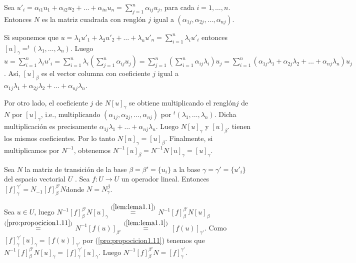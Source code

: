     		\begin{demo}
    			\normalfont
    			Sea $ u'_{i} = \alpha_{i1}u_{1}+\alpha_{i2}u_{2}+\ldots+\alpha_{in}u_{n} = \sum_{j=1}^{n}\alpha_{ij}u_{j}$, para cada $ i = 1,\ldots,n $. Entonces $ N $ es la matriz cuadrada con renglón $ j $ igual a $ (\alpha_{1j},\alpha_{2j},\ldots,\alpha_{nj}) $.
    	
    	Si suponemos que $ u = \lambda_{1}u'_{1}+\lambda_{2}u'_{2}+\ldots+\lambda_{n}u'_{n} = \sum_{i=1}^{n}\lambda_{i}u'_{i}$ entonces $ [u]_{\gamma} = ^{t}(\lambda_{1}, \ldots, \lambda_{n})$. Luego $ u = \sum_{i=1}^{n}\lambda_{i}u'_{i} = \sum_{i=1}^{n}\lambda_{i}(\sum_{j=1}^{n}\alpha_{ij}u_{j}) =  \sum_{j=1}^{n}(\sum_{i=1}^{n}\alpha_{ij}\lambda_{i})u_{j} = \sum_{i=1}^{n}(\alpha_{1j}\lambda_{1}+\alpha_{2j}\lambda_{2}+\ldots+\alpha_{nj}\lambda_{n})u_{j}$. Así, $ [u]_{\beta} $ es el vector columna con coeficiente $ j $ igual a $ \alpha_{1j}\lambda_{1}+\alpha_{2j}\lambda_{2}+\ldots+\alpha_{nj}\lambda_{n} $.
    	
    	Por otro lado, el coeficiente $ j $ de $ N[u]_{\gamma} $ se obtiene multiplicando el renglón$  j $ de $ N $ por $ [u]_{\gamma} $, i.e., multiplicando $ (\alpha_{1j},\alpha_{2j},\ldots,\alpha_{nj}) $ por $ ^{t}(\lambda_{1}, \ldots, \lambda_{n}) $. Dicha multiplicación es precisamente $ \alpha_{1j}\lambda_{1}+\ldots+\alpha_{nj}\lambda_{n} $. Luego $ N[u]_{\gamma}$ y $[u]_{\beta}$. tienen los mismos coeficientes. Por lo tanto $ N[u]_{\gamma}= [u]_{\beta}$. Finalmente, si multiplicamos por $ N^{-1} $, obtenemos $ N^{-1}[u]_{\beta} = N^{-1}N[u]_{\gamma} = [u]_{\gamma} $. 
    		\end{demo}
    	\begin{teo} \label{teo:teorema1.7}
    		 Sea $ N $ la matriz de transición de la base $ \beta = \beta ' = \{u_{i} \} $ a la base $ \gamma = \gamma '= \{u'_{i} \} $ del espacio vectorial $ U $ . Sea $ f : U \rightarrow U $ un operador
    		lineal. Entonces $ [f ]_{\gamma}^{\gamma'}
    		= N_{-1}[f]_{\beta}^{\beta '}N $donde $ N = N_{\gamma}^{\beta} $.
    	\end{teo}
    	\begin{demo}
    		Sea $ u \in U $, luego $ N^{-1}[f]_{\beta}^{\beta '}N[u]_{\gamma} $ $ \stackrel{(\ref{lem:lema1.1})}{=} $ $ N^{-1}[f]_{\beta}^{\beta '}N[u]_{\beta} $ $ \stackrel{(\ref{pro:propocicion1.11})}{=} $  $ N^{-1}[f(u)]_{\beta'} $ $ \stackrel{(\ref{lem:lema1.1})}{=} $  $ [f(u)]_{\gamma '} $. Como $ [f]_{\gamma}^{\gamma '}[u]_{\gamma} = [f(u)]_{\gamma '} $ por (\ref{pro:propocicion1.11})  tenemos que $ N^{-1}[f]_{\beta}^{\beta '}N[u]_{\gamma} =  [f]_{\gamma}^{\gamma '}[u]_{\gamma} $. Luego $ N^{-1}[f]_{\beta}^{\beta '}N =  [f]_{\gamma}^{\gamma '}$. 
    	\end{demo}
